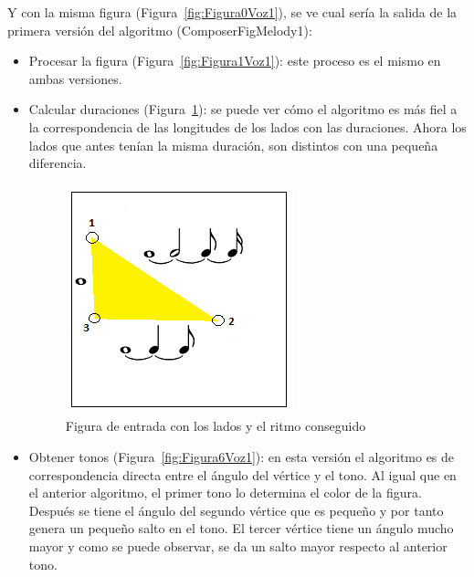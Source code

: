 Y con la misma figura (Figura~\ref{fig:Figura0Voz1}), se ve cual sería la salida de la primera versión del algoritmo (ComposerFigMelody1):

\begin{itemize}
	
	\item Procesar la figura (Figura~\ref{fig:Figura1Voz1}): este proceso es el mismo en ambas versiones. \\
	
	\item Calcular duraciones (Figura~\ref{fig:Figura5Voz1}): se puede ver cómo el algoritmo es más fiel a la correspondencia de las longitudes de los lados con las duraciones. Ahora los lados que antes tenían la misma duración, son distintos con una pequeña diferencia.\\
		
		\begin{figure}[!htbp]
		\centering
		\hspace*{0.0in}
		\includegraphics[scale=1]{graphics/simpletest1-F2_2.png}
		\caption{Figura de entrada con los lados y el ritmo conseguido}
		\label{fig:Figura5Voz1}
		\end{figure}

	\item Obtener tonos  (Figura~\ref{fig:Figura6Voz1}): en esta versión el algoritmo es de correspondencia directa entre el ángulo del vértice y el tono. Al igual que en el anterior algoritmo, el primer tono lo determina el color de la figura. Después se tiene el ángulo del segundo vértice que es pequeño y por tanto genera un pequeño salto en el tono. El tercer vértice tiene un ángulo mucho mayor y como se puede observar, se da un salto mayor respecto al anterior tono.
	

\end{itemize}
